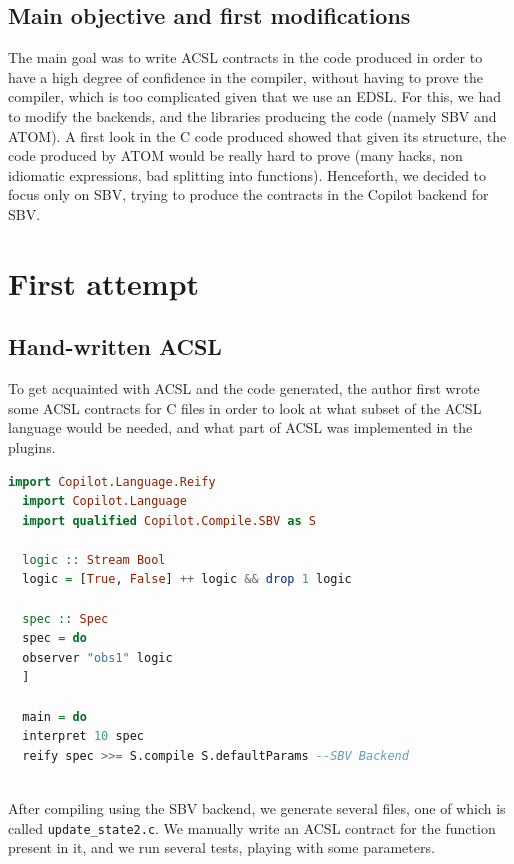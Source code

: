 \documentclass[a4paper,11pt,final]{article}
\begin{document}
  \subsection{Main objective and first modifications}
  The main goal was to write ACSL contracts in the code produced in order to have a high degree of confidence in the compiler, without having to prove the compiler, which is too complicated given that we use an EDSL. For this, we had to modify the backends, and the libraries producing the code (namely SBV and ATOM). A first look in the C code produced showed that given its structure, the code produced by ATOM would be really hard to prove (many hacks, non idiomatic expressions, bad splitting into functions). Henceforth, we decided to focus only on SBV, trying to produce the contracts in the Copilot backend for SBV.
  
  \section{First attempt}
  \subsection{Hand-written ACSL}
  
  To get acquainted with ACSL and the code generated, the author first wrote some ACSL contracts for C files in order to look at what subset of the ACSL language would be needed, and what part of ACSL was implemented in the plugins.
  
  \begin{lstlisting}[language=Haskell]
  import Copilot.Language.Reify
  import Copilot.Language
  import qualified Copilot.Compile.SBV as S
  
  logic :: Stream Bool
  logic = [True, False] ++ logic && drop 1 logic
  
  spec :: Spec
  spec = do
  observer "obs1" logic
  ]
  
  main = do
  interpret 10 spec
  reify spec >>= S.compile S.defaultParams --SBV Backend
  
  \end{lstlisting}
  
  After compiling using the SBV backend, we generate several files, one of which is called \texttt{update\_state2.c}. We manually write an ACSL contract for the function present in it, and we run several tests, playing with some parameters.
  
\end{document}
